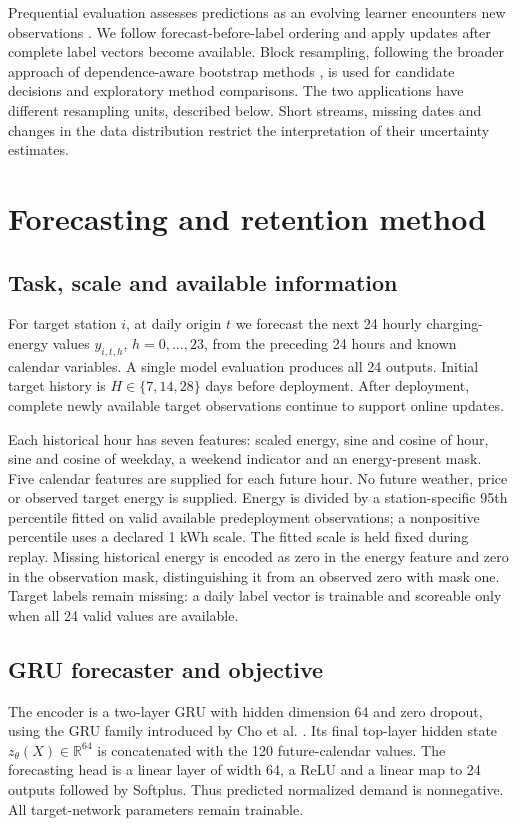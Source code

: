 \documentclass[pdflatex,iicol,sn-mathphys-num]{sn-jnl}
\begin{document}
Prequential evaluation assesses predictions as an evolving learner encounters new observations \cite{gama2013}. We follow forecast-before-label ordering and apply updates after complete label vectors become available. Block resampling, following the broader approach of dependence-aware bootstrap methods \cite{kunsch1989}, is used for candidate decisions and exploratory method comparisons. The two applications have different resampling units, described below. Short streams, missing dates and changes in the data distribution restrict the interpretation of their uncertainty estimates.

\section{Forecasting and retention method}\label{sec:method}
\subsection{Task, scale and available information}
For target station $i$, at daily origin $t$ we forecast the next 24 hourly charging-energy values $y_{i,t,h}$, $h=0,\ldots,23$, from the preceding 24 hours and known calendar variables. A single model evaluation produces all 24 outputs. Initial target history is $H\in\{7,14,28\}$ days before deployment. After deployment, complete newly available target observations continue to support online updates.

Each historical hour has seven features: scaled energy, sine and cosine of hour, sine and cosine of weekday, a weekend indicator and an energy-present mask. Five calendar features are supplied for each future hour. No future weather, price or observed target energy is supplied. Energy is divided by a station-specific 95th percentile fitted on valid available predeployment observations; a nonpositive percentile uses a declared 1 kWh scale. The fitted scale is held fixed during replay. Missing historical energy is encoded as zero in the energy feature and zero in the observation mask, distinguishing it from an observed zero with mask one. Target labels remain missing: a daily label vector is trainable and scoreable only when all 24 valid values are available.

\subsection{GRU forecaster and objective}
The encoder is a two-layer GRU with hidden dimension 64 and zero dropout, using the GRU family introduced by Cho et al. \cite{cho2014}. Its final top-layer hidden state $z_\theta(X)\in\mathbb{R}^{64}$ is concatenated with the 120 future-calendar values. The forecasting head is a linear layer of width 64, a ReLU and a linear map to 24 outputs followed by Softplus. Thus predicted normalized demand is nonnegative. All target-network parameters remain trainable.
\end{document}
